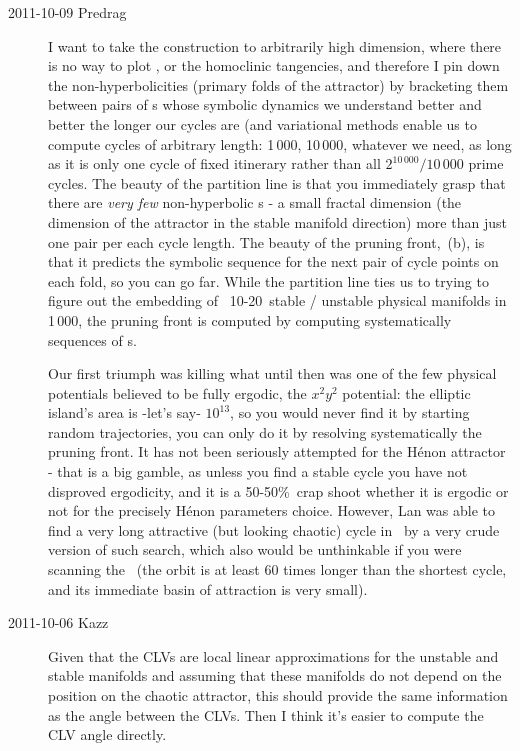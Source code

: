 \begin{description}
\item[2011-10-09 Predrag]
I want to take the construction to arbitrarily high dimension, where
there is no way to plot , or the
homoclinic tangencies, and therefore I pin down the non-hyperbolicities
(primary folds of the attractor) by bracketing them between pairs of \po
s whose symbolic dynamics we understand better and better the longer our
cycles are (and variational methods enable us to compute cycles of
arbitrary length: 1\,000, 10\,000, whatever we need, as long as it is
only one cycle of fixed itinerary rather than all $2^{10\,000}/10\,000$
prime cycles. The beauty of the partition line is that you immediately
grasp that there are \emph{very few} non-hyperbolic \po s - a small
fractal dimension (the dimension of the attractor in the stable manifold
direction) more than just one pair per each cycle length. The beauty of
the pruning front, \,(b), is that it predicts the
symbolic sequence for the next pair of cycle points on each fold, so you
can go far. While the partition line ties us to trying to figure out the
embedding of \KS\ 10-20\dmn\ stable / unstable physical manifolds in
1\,000\dmn, the pruning front is computed by computing systematically
sequences of \po s.

Our first triumph was killing what until then was one of the
few physical potentials believed to be fully ergodic, the $x^{2}y^{2}$
potential: the elliptic island's area is -let's say- $10^13$, so you
would never find it by starting random trajectories, you can only do it
by  resolving systematically the pruning front. It has not been seriously
attempted for the H\'enon attractor - that is a big gamble, as unless you
find a stable cycle you have not disproved ergodicity, and it is a
50-50\%\ crap shoot whether it is ergodic or not for the precisely
H\'enon parameters choice. However, Lan was able to find a
very long attractive (but looking chaotic) cycle in \KS\ by a very crude
version of such search, which also would be unthinkable if you were
scanning the \statesp\ (the orbit is at least 60 times longer than the
shortest cycle, and its immediate basin of attraction is very small).

\item[2011-10-06 Kazz]
Given that the CLVs are local linear approximations for the unstable and
stable manifolds and assuming that these manifolds do not depend on the
position on the chaotic attractor, this should provide the same
information as the angle between the CLVs. Then I think it's easier to
compute the CLV angle directly.


\end{description}
